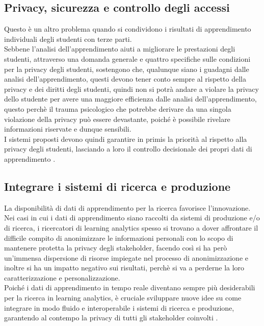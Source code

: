 \subsection{Privacy, sicurezza e controllo degli accessi}
Questo è un altro problema quando si condividono i risultati di apprendimento individuali degli studenti con terze parti. 
\\Sebbene l'analisi dell'apprendimento aiuti a migliorare le prestazioni degli studenti, attraverso una domanda generale e quattro specifiche sulle condizioni per la privacy degli studenti, sostengono che, qualunque siano i guadagni dalle analisi dell'apprendimento, questi devono tener conto sempre al rispetto della privacy e dei diritti degli studenti,
quindi non si potrà andare a violare la privacy dello studente per avere una maggiore efficienza dalle analisi dell'apprendimento,
questo perchè il trauma psicologico che potrebbe derivare da una singola violazione della privacy può essere devastante, poiché è possibile rivelare informazioni riservate e dunque sensibili. 
\\I sistemi proposti devono quindi garantire in primis la priorità al rispetto alla privacy degli studenti, lasciando a loro il controllo decisionale dei propri dati di apprendimento \cite{ocheja2018connecting}.

\subsection{Integrare i sistemi di ricerca e produzione}
La disponibilità di dati di apprendimento per la ricerca favorisce l'innovazione. 
Nei casi in cui i dati di apprendimento siano raccolti da sistemi di produzione e/o di ricerca, i ricercatori di learning analytics spesso si trovano a dover affrontare il difficile compito di anonimizzare le informazioni personali con lo scopo di mantenere protetta la privacy degli stakeholder, facendo così si ha però un'immensa dispersione di risorse impiegate nel processo di anonimizzazione e inoltre si ha un impatto negativo sui risultati, perchè si va a perderne la loro caratterizzazione e personalizzazione. 
\\Poiché i dati di apprendimento in tempo reale diventano sempre più desiderabili per la ricerca in learning analytics, è cruciale sviluppare nuove idee su come integrare in modo fluido e interoperabile i sistemi di ricerca e produzione, garantendo al contempo la privacy di tutti gli stakeholder coinvolti \cite{ocheja2018connecting}.

